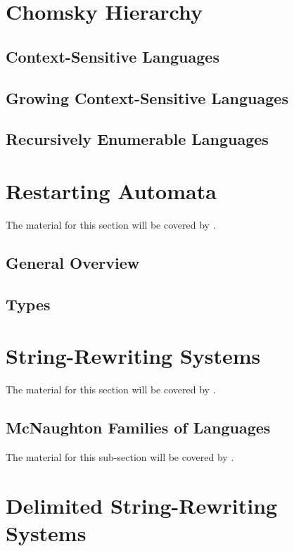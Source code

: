 \section{Chomsky Hierarchy}
\label{section:chomsky-hierarchy}

\subsection{Context-Sensitive Languages}

\subsection{Growing Context-Sensitive Languages}

\subsection{Recursively Enumerable Languages}

\section{Restarting Automata}
\label{section:restarting-automata}

The material for this section will be covered by \cite{O06}.

\subsection{General Overview}

\subsection{Types}

\section{String-Rewriting Systems}
\label{section:string-rewriting-systems}

The material for this section will be covered by \cite{bookOtto93}.

\subsection{McNaughton Families of Languages}

The material for this sub-section will be covered by \cite{Beaudry2003}.

\section{Delimited String-Rewriting Systems}
\label{section:delimited-string-rewriting-systems}

